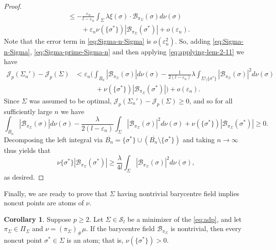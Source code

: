 \documentclass[preprint, reqno]{amsart}
\renewcommand{\epsilon}{\varepsilon}
\theoremstyle{definition}
\newtheorem{corollary}[definition]{Corollary}
\numberwithin{equation}{section}
\begin{document}
\begin{proof}
\begin{align}
    &\leq -\frac{\epsilon_n}{l-\epsilon_n}\int_\Sigma \lambda
      \xi(\sigma) \cdot \mathcal B_{\pi_\Sigma}(\sigma) d\nu(\sigma)
      \nonumber \\
    &\qquad + \epsilon_n\nu(\{\sigma^*\}) |\mathcal
      B_{\pi_\Sigma}(\sigma^*)| +
      o(\epsilon_n). \label{eq:Sigma-prime-Sigma-n}
  \end{align}
  Note that the error term in \eqref{eq:Sigma-n-Sigma} is
  $o(\epsilon_n^2)$. So, adding \eqref{eq:Sigma-n-Sigma},
  \eqref{eq:Sigma-prime-Sigma-n} and then applying
  \eqref{eq:applying-lem-2-11} we have
  \begin{align*}
    \mathscr{J}_p(\Sigma_n') - \mathscr{J}_p(\Sigma)
    &< \epsilon_n \bigg(\int_{\overline{B_n}}
      |\mathcal{B}_{\pi_{\Sigma}}(\sigma)|d\nu(\sigma) -
      \frac{1}{2(l-\epsilon_n)}\lambda \int_{\Sigma \setminus
      \{\sigma^*\}} |\mathcal{B}_{\pi_{\Sigma}}(\sigma)|^2
      d\nu(\sigma) \\
    &\quad \qquad + \nu(\{\sigma^*\}) |\mathcal
      B_{\pi_\Sigma}(\sigma^*)| \bigg) + o(\epsilon_n).
  \end{align*}
  Since $\Sigma$ was assumed to be optimal, $\mathscr{J}_p(\Sigma_n') -
  \mathscr{J}_p(\Sigma) \geq 0$, and so for all sufficiently large $n$
  we have
  \[
    \int_{\overline{B_n}}|\mathcal{B}_{\pi_{\Sigma}}(\sigma)|d\nu(\sigma)
    - \frac{\lambda}{2(l-\epsilon_n)} \int_{\Sigma }
    |\mathcal{B}_{\pi_{\Sigma}}(\sigma)|^2 d\nu(\sigma) +
    \nu(\{\sigma^*\}) |\mathcal B_{\pi_\Sigma}(\sigma^*)| \geq 0.
  \]
  Decomposing the left integral via $\overline{B_n} = \{\sigma^*\}
  \cup (\overline{B_n} \setminus \{\sigma^*\})$ and taking $n \to
  \infty$ thus yields that
  \[
    \nu\{\sigma^*\}|\mathcal{B}_{\pi_{\Sigma}}(\sigma^*)| \geq
    \frac{\lambda }{4l}\int_{\Sigma }
    |\mathcal{B}_{\pi_{\Sigma}}(\sigma)|^2 d\nu(\sigma),
  \]
  as desired.
\end{proof}

Finally, we are ready to prove that $\Sigma$ having nontrivial
barycentre field implies noncut points are atoms of $\nu$.
\begin{corollary}
  \label{cor:nontrivialequivatom}
  Suppose $p \geq 2$. Let $\Sigma \in \mathcal{S}_l$ be a minimizer of
  the \eqref{eq:adp}, and let $\pi_\Sigma\in \Pi_\Sigma$ and $\nu =
  (\pi_{\Sigma})_{\#}\mu$. If the barycentre field
  $\mathcal{B}_{\pi_\Sigma}$ is nontrivial, then every noncut point
  $\sigma^* \in \Sigma$ is an atom; that is, $\nu (\{\sigma^*\})>0.$
\end{corollary}
\end{document}
